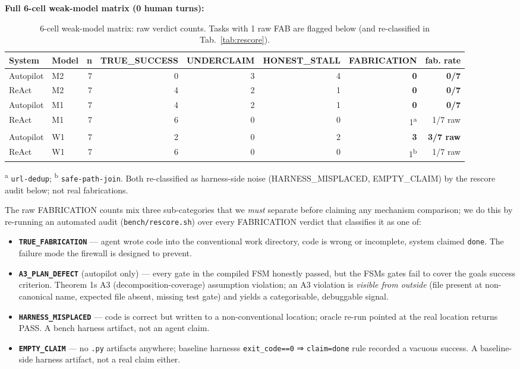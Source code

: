 \textbf{Full 6-cell weak-model matrix (0 human turns):}

{\scriptsize\begin{longtable}[]{@{}llrrrrrr@{}}
\caption{6-cell weak-model matrix: raw verdict counts. Tasks with 1 raw FAB are flagged below (and re-classified in Tab.~\ref{tab:rescore}).}\label{tab:weak-model-6cell}\\
\toprule\noalign{}
System & Model & n & TRUE\_SUCCESS & UNDERCLAIM & HONEST\_STALL & FABRICATION & fab. rate \\
\midrule\noalign{}
\endhead
\bottomrule\noalign{}
\endlastfoot
Autopilot & M2 & 7 & 0 & 3 & 4 & \textbf{0} & \textbf{0/7} \\
ReAct & M2 & 7 & 4 & 2 & 1 & \textbf{0} & \textbf{0/7} \\
Autopilot & M1 & 7 & 4 & 2 & 1 & \textbf{0} & \textbf{0/7} \\
ReAct & M1 & 7 & 6 & 0 & 0 & 1\textsuperscript{a} & 1/7 raw \\
Autopilot & W1 & 7 & 2 & 0 & 2 & \textbf{3} & \textbf{3/7 raw} \\
ReAct & W1 & 7 & 6 & 0 & 0 & 1\textsuperscript{b} & 1/7 raw \\
\end{longtable}}

\noindent\textsuperscript{a} \texttt{url-dedup}; \textsuperscript{b} \texttt{safe-path-join}. Both re-classified
as harness-side noise (HARNESS\_MISPLACED, EMPTY\_CLAIM) by the rescore audit below; not real fabrications.

The raw FABRICATION counts mix three sub-categories that we \emph{must} separate before claiming any
mechanism comparison; we do this by re-running an automated audit (\texttt{bench/rescore.sh}) over every
FABRICATION verdict that classifies it as one of:

\begin{itemize}
\tightlist
\item
  \textbf{\texttt{TRUE\_FABRICATION}} --- agent wrote code into the conventional work directory, code is
  wrong or incomplete, system claimed \texttt{done}. The failure mode the firewall is designed to prevent.
\item
  \textbf{\texttt{A3\_PLAN\_DEFECT}} (autopilot only) --- every gate in the compiled FSM honestly passed, but the
  FSM\textquotesingle s gates fail to cover the goal\textquotesingle s success criterion. Theorem 1\textquotesingle s A3 (decomposition-coverage)
  assumption violation; an A3 violation is \emph{visible from outside} (file present at non-canonical
  name, expected file absent, missing test gate) and yields a categorisable, debuggable signal.
\item
  \textbf{\texttt{HARNESS\_MISPLACED}} --- code is correct but written to a non-conventional location; oracle
  re-run pointed at the real location returns PASS. A bench harness artifact, not an agent claim.
\item
  \textbf{\texttt{EMPTY\_CLAIM}} --- no \texttt{.py} artifacts anywhere; baseline harness\textquotesingle s \texttt{exit\_code==0} ⇒ \texttt{claim=done}
  rule recorded a vacuous success. A baseline-side harness artifact, not a real claim either.
\end{itemize}

